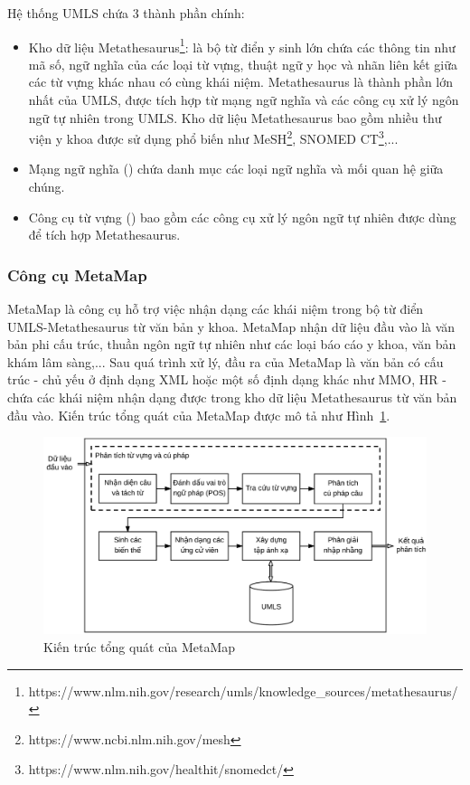 Hệ thống UMLS chứa 3 thành phần chính:
\begin{itemize}
\item Kho dữ liệu Metathesaurus\footnote{https://www.nlm.nih.gov/research/umls/knowledge\_sources/metathesaurus/}: là bộ từ điển y sinh lớn chứa các thông tin như mã số, ngữ nghĩa của các loại từ vựng, thuật ngữ y học và nhãn liên kết giữa các từ vựng khác nhau có cùng khái niệm. Metathesaurus là thành phần lớn nhất của UMLS, được tích hợp từ mạng ngữ nghĩa và các công cụ xử lý ngôn ngữ tự nhiên trong UMLS. Kho dữ liệu Metathesaurus bao gồm nhiều thư viện y khoa được sử dụng phổ biến như MeSH\footnote{https://www.ncbi.nlm.nih.gov/mesh}, SNOMED CT\footnote{https://www.nlm.nih.gov/healthit/snomedct/},...
\item Mạng ngữ nghĩa () chứa danh mục các loại ngữ nghĩa và mối quan hệ giữa chúng.
\item Công cụ từ vựng () bao gồm các công cụ xử lý ngôn ngữ tự nhiên được dùng để tích hợp Metathesaurus.
\end{itemize}

\subsubsection*{Công cụ MetaMap}
MetaMap là công cụ hỗ trợ việc nhận dạng các khái niệm trong bộ từ điển UMLS-Metathesaurus từ văn bản y khoa. MetaMap nhận dữ liệu đầu vào là văn bản phi cấu trúc, thuần ngôn ngữ tự nhiên như các loại báo cáo y khoa, văn bản khám lâm sàng,... Sau quá trình xử lý, đầu ra của MetaMap là văn bản có cấu trúc - chủ yếu ở định dạng XML hoặc một số định dạng khác như MMO, HR - chứa các khái niệm nhận dạng được trong kho dữ liệu Metathesaurus từ văn bản đầu vào. Kiến trúc tổng quát của MetaMap được mô tả như Hình~\ref{fig:kientrucmetamap}.\\

\begin{figure}[H]
\centering
\includegraphics[scale=0.52]{../hinh/KienTrucMetamap.png}
\caption{Kiến trúc tổng quát của MetaMap \cite{Aronson2010}} \label{fig:kientrucmetamap}
\end{figure}


